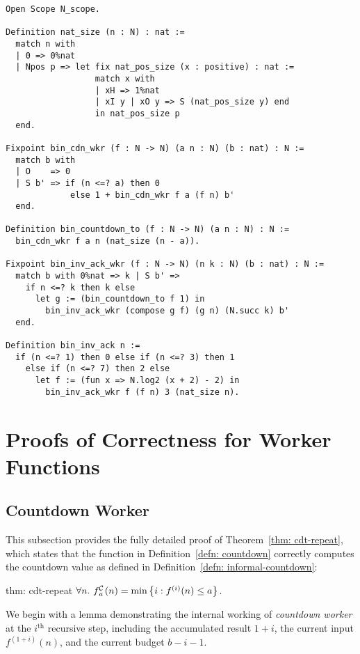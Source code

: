 \begin{lstlisting}
Open Scope N_scope.

Definition nat_size (n : N) : nat :=
  match n with
  | 0 => 0%nat
  | Npos p => let fix nat_pos_size (x : positive) : nat :=
                  match x with
                  | xH => 1%nat
                  | xI y | xO y => S (nat_pos_size y) end
                  in nat_pos_size p
  end.

Fixpoint bin_cdn_wkr (f : N -> N) (a n : N) (b : nat) : N :=
  match b with
  | O    => 0
  | S b' => if (n <=? a) then 0
             else 1 + bin_cdn_wkr f a (f n) b'
  end.

Definition bin_countdown_to (f : N -> N) (a n : N) : N := 
  bin_cdn_wkr f a n (nat_size (n - a)).

Fixpoint bin_inv_ack_wkr (f : N -> N) (n k : N) (b : nat) : N :=
  match b with 0%nat => k | S b' => 
    if n <=? k then k else 
      let g := (bin_countdown_to f 1) in
        bin_inv_ack_wkr (compose g f) (g n) (N.succ k) b'
  end.

Definition bin_inv_ack n :=
  if (n <=? 1) then 0 else if (n <=? 3) then 1
    else if (n <=? 7) then 2 else 
      let f := (fun x => N.log2 (x + 2) - 2) in
        bin_inv_ack_wkr f (f n) 3 (nat_size n).
\end{lstlisting}
\lstset{style=myStyle}

\vspace{1em}
\section{Proofs of Correctness for Worker Functions}
\label{apx:proof_correct_worker}

\subsection{Countdown Worker}
\label{apx:proof_correct_countdown_worker}
This subsection provides the fully detailed proof of Theorem~\ref{thm: cdt-repeat}, which states that the function in Definition~\ref{defn: countdown} correctly computes the countdown value as defined in Definition~\ref{defn: informal-countdown}:
\begin{usethmcounterof}{thm: cdt-repeat}
	$	\forall n.~ \cdt{f}{a}(n) = \min\left\{ i : f^{(i)}(n) \le a \right\} $.
\end{usethmcounterof}
We begin with a lemma demonstrating the internal working of \emph{countdown worker} at the $i^\text{th}$ recursive step, including the accumulated result $1+i$, the current \linebreak input $f^{(1+i)}(n)$, and the current budget $b-i-1$.

